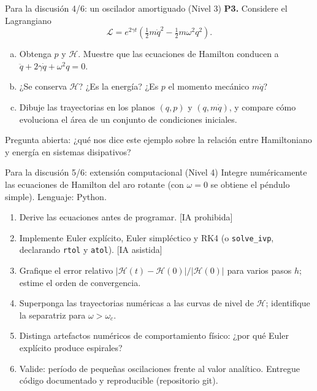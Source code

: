 \documentclass[spanish]{beamer}
\newcommand{\Lag}{\mathcal{L}}               %
\newcommand{\Ham}{\mathcal{H}}               %
\begin{document}
\begin{frame}{Para la discusión 4/6: un oscilador amortiguado (Nivel 3)}
\textbf{P3.} Considere el Lagrangiano
\[
  \Lag=e^{2\gamma t}\left(\tfrac12 m\dot q^2-\tfrac12 m\omega^2q^2\right).
\]
\begin{enumerate}[(a)]
  \item Obtenga $p$ y $\Ham$. Muestre que las ecuaciones de Hamilton conducen a
        $\ddot q+2\gamma\dot q+\omega^2q=0$.
  \item ¿Se conserva $\Ham$? ¿Es la energía? ¿Es $p$ el momento mecánico $m\dot q$?
  \item Dibuje las trayectorias en los planos $(q,p)$ y $(q,m\dot q)$, y compare cómo
        evoluciona el área de un conjunto de condiciones iniciales.
\end{enumerate}
\medskip
{\small Pregunta abierta: ¿qué nos dice este ejemplo sobre la relación entre
Hamiltoniano y energía en sistemas disipativos?}
\end{frame}

\begin{frame}{Para la discusión 5/6: extensión computacional (Nivel 4)}
\small
Integre numéricamente las ecuaciones de Hamilton del aro rotante (con $\omega=0$
se obtiene el péndulo simple). Lenguaje: Python.
\par\normalsize
\begin{enumerate}[<+->]
  \item Derive las ecuaciones antes de programar. \hfill{\scriptsize[IA prohibida]}
  \item Implemente Euler explícito, Euler simpléctico y RK4 (o \texttt{solve\_ivp},
        declarando \texttt{rtol} y \texttt{atol}). \hfill{\scriptsize[IA asistida]}
  \item Grafique el error relativo $|\Ham(t)-\Ham(0)|/|\Ham(0)|$ para varios pasos $h$;
        estime el orden de convergencia.
  \item Superponga las trayectorias numéricas a las curvas de nivel de $\Ham$;
        identifique la separatriz para $\omega>\omega_c$.
  \item Distinga artefactos numéricos de comportamiento físico: ¿por qué Euler explícito
        produce espirales?
  \item Valide: período de pequeñas oscilaciones frente al valor analítico.
        Entregue código documentado y reproducible (repositorio git).
\end{enumerate}
\end{frame}
\end{document}
